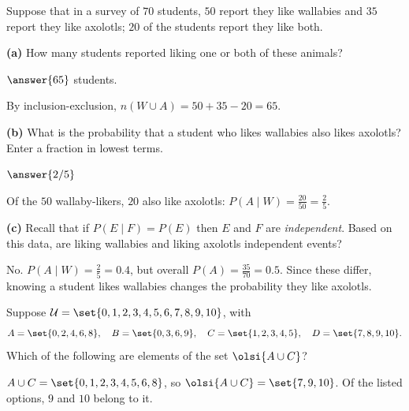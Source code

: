 \documentclass[12pt]{ximera}
\begin{document}
\begin{problem}
Suppose that in a survey of $70$ students, $50$ report they like wallabies and $35$
report they like axolotls; $20$ of the students report they like both.

\begin{prompt}
\textbf{(a)} How many students reported liking one or both of these animals?

$\answer{65}$ students.

\begin{feedback}
By inclusion-exclusion, $n(W\cup A)=50+35-20=65$.
\end{feedback}
\end{prompt}

\begin{prompt}
\textbf{(b)} What is the probability that a student who likes wallabies also likes
axolotls? Enter a fraction in lowest terms.

$\answer{2/5}$

\begin{feedback}
Of the $50$ wallaby-likers, $20$ also like axolotls:
$P(A\mid W)=\frac{20}{50}=\frac25$.
\end{feedback}
\end{prompt}

\begin{prompt}
\textbf{(c)} Recall that if $P(E\mid F)=P(E)$ then $E$ and $F$ are \emph{independent}.
Based on this data, are liking wallabies and liking axolotls independent events?

\begin{multipleChoice}
\end{multipleChoice}

\begin{feedback}
No. $P(A\mid W)=\frac25=0.4$, but overall $P(A)=\frac{35}{70}=0.5$. Since these differ,
knowing a student likes wallabies changes the probability they like axolotls.
\end{feedback}
\end{prompt}
\end{problem}

\begin{problem}
Suppose $\mathcal{U}=\set{0,1,2,3,4,5,6,7,8,9,10}$, with
\[
A= \set{0,2,4,6,8},\quad B= \set{0,3,6,9},\quad C= \set{1,2,3,4,5},\quad D= \set{7,8,9,10}.
\]
Which of the following are elements of the set $\olsi{A\cup C}$?

\begin{selectAll}
\end{selectAll}

\begin{feedback}
$A\cup C=\set{0,1,2,3,4,5,6,8}$, so $\olsi{A\cup C}=\set{7,9,10}$. Of the listed
options, $9$ and $10$ belong to it.
\end{feedback}
\end{problem}
\end{document}
